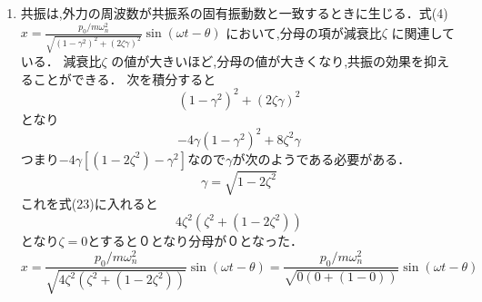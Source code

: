 \documentclass[a4paper,10.5pt]{jsarticle}
\begin{document}
\begin{enumerate}
  \item 共振は,外力の周波数が共振系の固有振動数と一致するときに生じる．式(4)
    $x = \frac{{p_0/m\omega_n^2}}{{\sqrt{{(1-\gamma^2)^2+(2\zeta\gamma)^2}}}}\sin(\omega{t}-\theta)$
  において,分母の項が減衰比$\zeta$ に関連している．
  減衰比$\zeta$ の値が大きいほど,分母の値が大きくなり,共振の効果を抑えることができる．
  次を積分すると
  \begin{equation}
   {{(1-\gamma^2)^2+(2\zeta\gamma)^2}} 
  \end{equation}
  となり
  \begin{equation}
    -4\gamma(1-\gamma^2)^2+8\zeta^2\gamma
  \end{equation} 
  つまり$-4\gamma[(1-2\zeta^2)-\gamma^2]$なので$\gamma$が次のようである必要がある．
  \begin{equation}
   \gamma={\sqrt{1-2\zeta^2}}
  \end{equation}  
  これを式(23)に入れると
  \begin{equation}
    4\zeta^2(\zeta^2+(1-2\zeta^2))
  \end{equation}    
  となり$\zeta=0$とすると０となり分母が０となった．
  \begin{equation}
  x = \frac{{p_0/m\omega_n^2}}{{\sqrt{{4\zeta^2(\zeta^2+(1-2\zeta^2))}}}}\sin(\omega{t}-\theta)
    = \frac{{p_0/m\omega_n^2}}{{\sqrt{{0(0+(1-0))}}}}\sin(\omega{t}-\theta)
\end{equation} 
\\


\end{enumerate}
\end{document}
